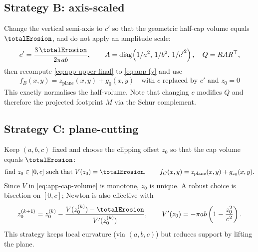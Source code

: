 \subsection*{Strategy B: axis-scaled}
Change the vertical semi-axis to $c'$ so that the geometric half-cap volume equals $\totalErosion$, and do not apply an amplitude scale:
\begin{align}
    \label{eq:app-stratB}
    c'=\frac{3\,\totalErosion}{2\pi a b},\qquad
    A=\operatorname{diag}\!\left(1/a^2,\,1/b^2,\,1/{c'}^{2}\right),\quad Q=RAR^\top,
\end{align}
then recompute \cref{eq:app-upper-final} to \cref{eq:app-fy} and use
\begin{align}
    f_B(x,y)=z_{\text{plane}}(x,y)+g_{0}(x,y)\quad\text{with $c$ replaced by $c'$ and $z_0=0$}
\end{align}
This exactly normalises the half-volume. Note that changing $c$ modifies $Q$ and therefore the projected footprint $M$ via the Schur complement.

\subsection*{Strategy C: plane-cutting}
Keep $(a,b,c)$ fixed and choose the clipping offset $z_0$ so that the cap volume equals $\totalErosion$:
\begin{align}
    \label{eq:app-stratC}
    \text{find }z_0\in[0,c]\ \text{such that}\ V(z_0)=\totalErosion,\qquad f_C(x,y)=z_{\text{plane}}(x,y)+g_{z_0}(x,y).
\end{align}
Since $V$ in \cref{eq:app-cap-volume} is monotone, $z_0$ is unique. A robust choice is bisection on $[0,c]$; Newton is also effective with
\begin{align}
    z_0^{(k+1)}=z_0^{(k)}-\frac{V(z_0^{(k)})-\totalErosion}{V'(z_0^{(k)})},\qquad
    V'(z_0)=-\pi a b\left(1-\frac{z_0^2}{c^2}\right).
\end{align}
This strategy keeps local curvature (via $(a,b,c)$) but reduces support by lifting the plane.


